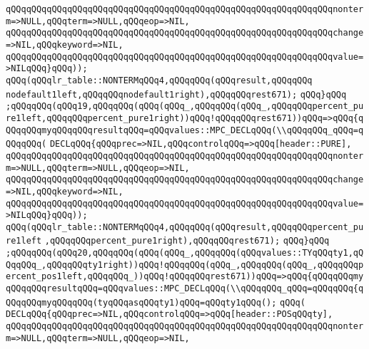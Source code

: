 \verb|qQQqqQQqqQQqqQQqqQQqqQQqqQQqqQQqqQQqqQQqqQQqqQQqqQQqqQQqqQQqqQQqnonterm=>NULL,qQQqterm=>NULL,qQQqeop=>NIL,|\newline
\verb|qQQqqQQqqQQqqQQqqQQqqQQqqQQqqQQqqQQqqQQqqQQqqQQqqQQqqQQqqQQqqQQqchange=>NIL,qQQqkeyword=>NIL,|\newline
\verb|qQQqqQQqqQQqqQQqqQQqqQQqqQQqqQQqqQQqqQQqqQQqqQQqqQQqqQQqqQQqqQQqvalue=>NILqQQq}qQQq));|\newline
\verb|qQQq(qQQqlr_table::NONTERMqQQq4,qQQqqQQq(qQQqresult,qQQqqQQq|\newline
\verb|nodefault1left,qQQqqQQqnodefault1right),qQQqqQQqrest671);|\newline
\verb|qQQq}qQQq|\newline
\verb|;qQQqqQQq(qQQq19,qQQqqQQq(qQQq(qQQq_,qQQqqQQq(qQQq_,qQQqqQQqpercent_pure1left,qQQqqQQqpercent_pure1right))qQQq!qQQqqQQqrest671))qQQq=>qQQq{qQQqqQQqmyqQQqqQQqresultqQQq=qQQqvalues::MPC_DECLqQQq(\\qQQqqQQq_qQQq=qQQqqQQq(|\newline
\verb|DECLqQQq{qQQqprec=>NIL,qQQqcontrolqQQq=>qQQq[header::PURE],|\newline
\verb|qQQqqQQqqQQqqQQqqQQqqQQqqQQqqQQqqQQqqQQqqQQqqQQqqQQqqQQqqQQqqQQqnonterm=>NULL,qQQqterm=>NULL,qQQqeop=>NIL,|\newline
\verb|qQQqqQQqqQQqqQQqqQQqqQQqqQQqqQQqqQQqqQQqqQQqqQQqqQQqqQQqqQQqqQQqchange=>NIL,qQQqkeyword=>NIL,|\newline
\verb|qQQqqQQqqQQqqQQqqQQqqQQqqQQqqQQqqQQqqQQqqQQqqQQqqQQqqQQqqQQqqQQqvalue=>NILqQQq}qQQq));|\newline
\verb|qQQq(qQQqlr_table::NONTERMqQQq4,qQQqqQQq(qQQqresult,qQQqqQQqpercent_pure1left|\newline
\verb|,qQQqqQQqpercent_pure1right),qQQqqQQqrest671);|\newline
\verb|qQQq}qQQq|\newline
\verb|;qQQqqQQq(qQQq20,qQQqqQQq(qQQq(qQQq_,qQQqqQQq(qQQqvalues::TYqQQqty1,qQQqqQQq_,qQQqqQQqty1right))qQQq!qQQqqQQq(qQQq_,qQQqqQQq(qQQq_,qQQqqQQqpercent_pos1left,qQQqqQQq_))qQQq!qQQqqQQqrest671))qQQq=>qQQq{qQQqqQQqmyqQQqqQQqresultqQQq=qQQqvalues::MPC_DECLqQQq(\\qQQqqQQq_qQQq=qQQqqQQq{qQQqqQQqmyqQQqqQQq(tyqQQqasqQQqty1)qQQq=qQQqty1qQQq();|\newline
\verb|qQQq(|\newline
\verb|DECLqQQq{qQQqprec=>NIL,qQQqcontrolqQQq=>qQQq[header::POSqQQqty],|\newline
\verb|qQQqqQQqqQQqqQQqqQQqqQQqqQQqqQQqqQQqqQQqqQQqqQQqqQQqqQQqqQQqqQQqnonterm=>NULL,qQQqterm=>NULL,qQQqeop=>NIL,|\newline
